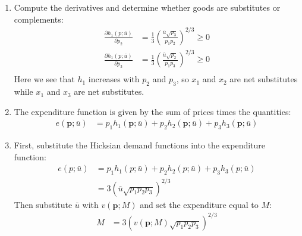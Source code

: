 \documentclass[UTF8,titlepage]{article}
\numberwithin{figure}{section}
\begin{document}
\begin{enumerate}
    \item Compute the derivatives and determine whether goods are substitutes or complements:
    \begin{align*}
        \frac{\partial h_1(p; \bar{u})}{\partial p_2} &= \frac{1}{3} \left(\frac{\bar{u} \sqrt{p_3}}{p_1 p_2}\right)^{2/3} \geq 0 \\
        \frac{\partial h_1(p; \bar{u})}{\partial p_3} &= \frac{1}{3} \left(\frac{\bar{u} \sqrt{p_2}}{p_1 p_3}\right)^{2/3} \geq 0  \\
        \end{align*}
        Here we see that $h_1$ increases with $p_2$ and $p_3$, so $x_1$ and $x_2$ are net substitutes while $x_1$ and $x_3$ are net substitutes.
    \item The expenditure function is given by the sum of prices times the quantities:
    \begin{align*}
        e(\textbf{p}; \bar{u}) &= p_1 h_1(\textbf{p}; \bar{u}) + p_2 h_2(\textbf{p}; \bar{u}) + p_3 h_3(\textbf{p}; \bar{u})
        \end{align*}
    \item First, substitute the Hicksian demand functions into the expenditure function:
    \begin{align*}
        e(p; \bar{u}) &= p_1 h_1(p; \bar{u}) + p_2 h_2(p; \bar{u}) + p_3 h_3(p; \bar{u}) \\
        &= 3 \left(\bar{u} \sqrt{p_1 p_2 p_3}\right)^{2/3}
        \end{align*}
        Then substitute $\bar{u}$ with $v(\textbf{p}; M)$ and set the expenditure equal to $M$:
        \begin{align*}
            M &= 3 \left(v(\textbf{p}; M) \sqrt{p_1 p_2 p_3}\right)^{2/3}
            \end{align*}
            

\end{enumerate}
\end{document}
